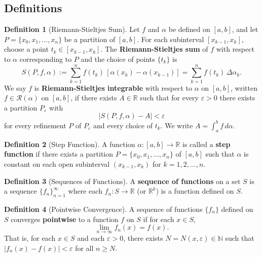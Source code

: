 \documentclass[12pt,a4paper]{article}
\theoremstyle{definition}
\newtheorem{definition}{Definition}[section]
\newcommand{\R}{\mathbb{R}}
\newcommand{\N}{\mathbb{N}}
\newcommand{\eps}{\varepsilon}
\begin{document}
\subsection{Definitions}

\begin{definition}[Riemann-Stieltjes Sum]
Let $f$ and $\alpha$ be defined on $[a,b]$, and let $P = \{x_0, x_1, \ldots, x_n\}$ be a partition of $[a,b]$. For each subinterval $[x_{k-1}, x_k]$, choose a point $t_k \in [x_{k-1}, x_k]$. The \textbf{Riemann-Stieltjes sum} of $f$ with respect to $\alpha$ corresponding to $P$ and the choice of points $\{t_k\}$ is
\[
    S(P, f, \alpha) := \sum_{k=1}^n f(t_k)\,[\alpha(x_k) - \alpha(x_{k-1})] = \sum_{k=1}^n f(t_k)\,\Delta\alpha_k.
\]
We say $f$ is \textbf{Riemann-Stieltjes integrable} with respect to $\alpha$ on $[a,b]$, written $f \in \mathcal{R}(\alpha)$ on $[a,b]$, if there exists $A \in \R$ such that for every $\eps > 0$ there exists a partition $P_\eps$ with
\[
    |S(P, f, \alpha) - A| < \eps
\]
for every refinement $P$ of $P_\eps$ and every choice of $t_k$. We write $A = \int_a^b f\,d\alpha$.
\end{definition}

\begin{definition}[Step Function]
A function $\alpha: [a,b] \to \R$ is called a \textbf{step function} if there exists a partition $P = \{x_0, x_1, \ldots, x_n\}$ of $[a,b]$ such that $\alpha$ is constant on each open subinterval $(x_{k-1}, x_k)$ for $k = 1, 2, \ldots, n$.
\end{definition}

\begin{definition}[Sequences of Functions]
A \textbf{sequence of functions} on a set $S$ is a sequence $\{f_n\}_{n=1}^\infty$ where each $f_n: S \to \R$ (or $\R^k$) is a function defined on $S$.
\end{definition}

\begin{definition}[Pointwise Convergence]
A sequence of functions $\{f_n\}$ defined on $S$ converges \textbf{pointwise} to a function $f$ on $S$ if for each $x \in S$,
\[
    \lim_{n \to \infty} f_n(x) = f(x).
\]
That is, for each $x \in S$ and each $\eps > 0$, there exists $N = N(x, \eps) \in \N$ such that $|f_n(x) - f(x)| < \eps$ for all $n \geq N$.
\end{definition}
\end{document}
